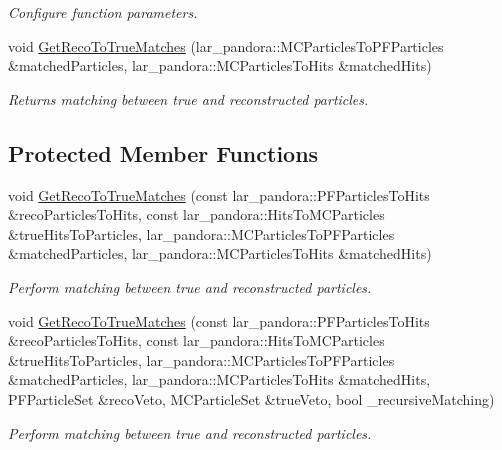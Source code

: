 \begin{DoxyCompactItemize}
\begin{DoxyCompactList}\small\item\em \-Configure function parameters. \end{DoxyCompactList}\item 
void \hyperlink{classubxsec_1_1McPfpMatch_a1b66ef44f3a1772a4e72de2e5066768c}{\-Get\-Reco\-To\-True\-Matches} (lar\-\_\-pandora\-::\-M\-C\-Particles\-To\-P\-F\-Particles \&matched\-Particles, lar\-\_\-pandora\-::\-M\-C\-Particles\-To\-Hits \&matched\-Hits)
\begin{DoxyCompactList}\small\item\em \-Returns matching between true and reconstructed particles. \end{DoxyCompactList}\end{DoxyCompactItemize}
\subsection*{\-Protected \-Member \-Functions}
\begin{DoxyCompactItemize}
\item 
void \hyperlink{classubxsec_1_1McPfpMatch_adb5138d94990f679643372e0be273940}{\-Get\-Reco\-To\-True\-Matches} (const lar\-\_\-pandora\-::\-P\-F\-Particles\-To\-Hits \&reco\-Particles\-To\-Hits, const lar\-\_\-pandora\-::\-Hits\-To\-M\-C\-Particles \&true\-Hits\-To\-Particles, lar\-\_\-pandora\-::\-M\-C\-Particles\-To\-P\-F\-Particles \&matched\-Particles, lar\-\_\-pandora\-::\-M\-C\-Particles\-To\-Hits \&matched\-Hits)
\begin{DoxyCompactList}\small\item\em \-Perform matching between true and reconstructed particles. \end{DoxyCompactList}\item 
void \hyperlink{classubxsec_1_1McPfpMatch_a0d41e3e0c60f2777cc26ca8b8520e9d2}{\-Get\-Reco\-To\-True\-Matches} (const lar\-\_\-pandora\-::\-P\-F\-Particles\-To\-Hits \&reco\-Particles\-To\-Hits, const lar\-\_\-pandora\-::\-Hits\-To\-M\-C\-Particles \&true\-Hits\-To\-Particles, lar\-\_\-pandora\-::\-M\-C\-Particles\-To\-P\-F\-Particles \&matched\-Particles, lar\-\_\-pandora\-::\-M\-C\-Particles\-To\-Hits \&matched\-Hits, \-P\-F\-Particle\-Set \&reco\-Veto, \-M\-C\-Particle\-Set \&true\-Veto, bool \-\_\-recursive\-Matching)
\begin{DoxyCompactList}\small\item\em \-Perform matching between true and reconstructed particles. \end{DoxyCompactList}\end{DoxyCompactItemize}
